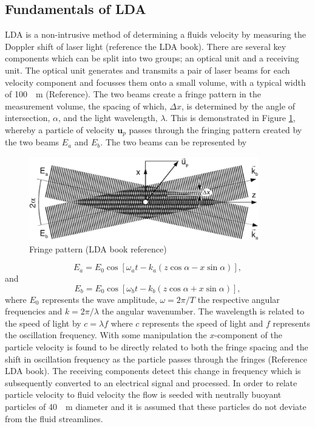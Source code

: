 \documentclass[12pt,oneside,a4paper]{article}
\newcommand{\vect}[1]{\boldsymbol{#1}}
\begin{document}
\subsection{Fundamentals of LDA}
LDA is a non-intrusive method of determining a fluids velocity by measuring the Doppler shift of laser light (reference the LDA book). There are several key components which can be split into two groups; an optical unit and a receiving unit. The optical unit generates and transmits a pair of laser beams for each velocity component and focusses them onto a small volume, with a typical width of \SI{100}{\mu m} (Reference). The two beams create a fringe pattern in the measurement volume, the spacing of which, $\Delta x$, is determined by the angle of intersection, $\alpha$, and the light wavelength, $\lambda$. This is demonstrated in Figure \ref{figure:experiments:fringePattern}, whereby a particle of velocity $\vect{u}_p$ passes through the fringing pattern created by the two beams $E_a$ and $E_b$. The two beams can be represented by 
%
\begin{figure}[!t]
\centering
\includegraphics[width=10cm]{images/LDA_theoryImages/fringePattern.png}
\caption{Fringe pattern (LDA book reference)}
\label{figure:experiments:fringePattern}
\end{figure}
%
\begin{equation}
E_a = E_0 \cos {\left[ \omega_a t - k_a (z \cos{\alpha} - x \sin{\alpha} ) \right]},
\end{equation}
and
\begin{equation}
E_b = E_0 \cos{ \left[ \omega_b t - k_b (z \cos{\alpha} + x \sin{\alpha} ) \right]},
\end{equation}
where $E_0$ represents the wave amplitude, $\omega = 2 \pi / T$ the respective angular frequencies and $k = 2 \pi / \lambda$ the angular wavenumber. The wavelength is related to the speed of light by $c = \lambda f$ where $c$ represents the speed of light and $f$ represents the oscillation frequency. With some manipulation the $x$-component of the particle velocity is found to be directly related to both the fringe spacing and the shift in oscillation frequency as the particle passes through the fringes (Reference LDA book). The receiving components detect this change in frequency which is subsequently converted to an electrical signal and processed. In order to relate particle velocity to fluid velocity the flow is seeded with neutrally buoyant particles of \SI{40}{\mu m} diameter and it is assumed that these particles do not deviate from the fluid streamlines. 
\end{document}
